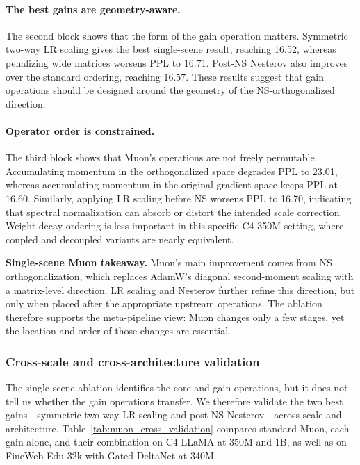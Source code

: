 \paragraph{The best gains are geometry-aware.}
The second block shows that the form of the gain operation matters. Symmetric
two-way LR scaling gives the best single-scene result, reaching 16.52, whereas
penalizing wide matrices worsens PPL to 16.71. Post-NS Nesterov also improves
over the standard ordering, reaching 16.57. These results suggest that gain
operations should be designed around the geometry of the NS-orthogonalized
direction.

\paragraph{Operator order is constrained.}
The third block shows that Muon's operations are not freely permutable.
Accumulating momentum in the orthogonalized space degrades PPL to 23.01,
whereas accumulating momentum in the original-gradient space keeps PPL at
16.60. Similarly, applying LR scaling before NS worsens PPL to 16.70,
indicating that spectral normalization can absorb or distort the intended
scale correction. Weight-decay ordering is less important in this specific
C4-350M setting, where coupled and decoupled variants are nearly equivalent.

\begin{takeaway}
\noindent\textbf{Single-scene Muon takeaway.}
Muon's main improvement comes from NS orthogonalization, which replaces
AdamW's diagonal second-moment scaling with a matrix-level direction. LR
scaling and Nesterov further refine this direction, but only when placed after
the appropriate upstream operations. The ablation therefore supports the
meta-pipeline view: Muon changes only a few stages, yet the location and order
of those changes are essential.
\end{takeaway}

\subsubsection{Cross-scale and cross-architecture validation}
\label{sec:benchmark-muon-cross-validation}

The single-scene ablation identifies the core and gain operations, but it does
not tell us whether the gain operations transfer. We therefore validate the two
best gains---symmetric two-way LR scaling and post-NS Nesterov---across scale
and architecture. Table~\ref{tab:muon_cross_validation} compares standard
Muon, each gain alone, and their combination on C4-LLaMA at 350M and 1B, as
well as on FineWeb-Edu 32k with Gated DeltaNet at 340M.

